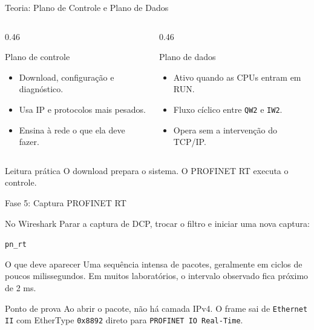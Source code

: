 \documentclass[10pt, aspectratio=169]{beamer}
\begin{document}
\begin{frame}{Teoria: Plano de Controle e Plano de Dados}
    \small
    \begin{columns}[T,totalwidth=\textwidth]
        \begin{column}{0.46\textwidth}
            \begin{block}{Plano de controle}
                \begin{itemize}
                    \item Download, configura\c{c}\~ao e diagn\'ostico.
                    \item Usa IP e protocolos mais pesados.
                    \item Ensina \`a rede o que ela deve fazer.
                \end{itemize}
            \end{block}
        \end{column}
        \begin{column}{0.46\textwidth}
            \begin{block}{Plano de dados}
                \begin{itemize}
                    \item Ativo quando as CPUs entram em RUN.
                    \item Fluxo c\'iclico entre \texttt{QW2} e \texttt{IW2}.
                    \item Opera sem a interven\c{c}\~ao do TCP/IP.
                \end{itemize}
            \end{block}
        \end{column}
    \end{columns}

    \vspace{0.35cm}
    \begin{block}{Leitura pr\'atica}
        O download prepara o sistema. O PROFINET RT executa o controle.
    \end{block}
\end{frame}

\begin{frame}{Fase 5: Captura PROFINET RT}
    \small
    \begin{block}{No Wireshark}
        Parar a captura de DCP, trocar o filtro e iniciar uma nova captura:
        \begin{center}
            \Large\texttt{pn\_rt}
        \end{center}
    \end{block}

    \begin{block}{O que deve aparecer}
        Uma sequ\^encia intensa de pacotes, geralmente em ciclos de poucos milissegundos. Em muitos laborat\'orios, o intervalo observado fica pr\'oximo de \alert{2 ms}.
    \end{block}

    \begin{block}{Ponto de prova}
        Ao abrir o pacote, n\~ao h\'a camada IPv4. O frame sai de \texttt{Ethernet II} com EtherType \texttt{0x8892} direto para \texttt{PROFINET IO Real-Time}.
    \end{block}
\end{frame}
\end{document}
